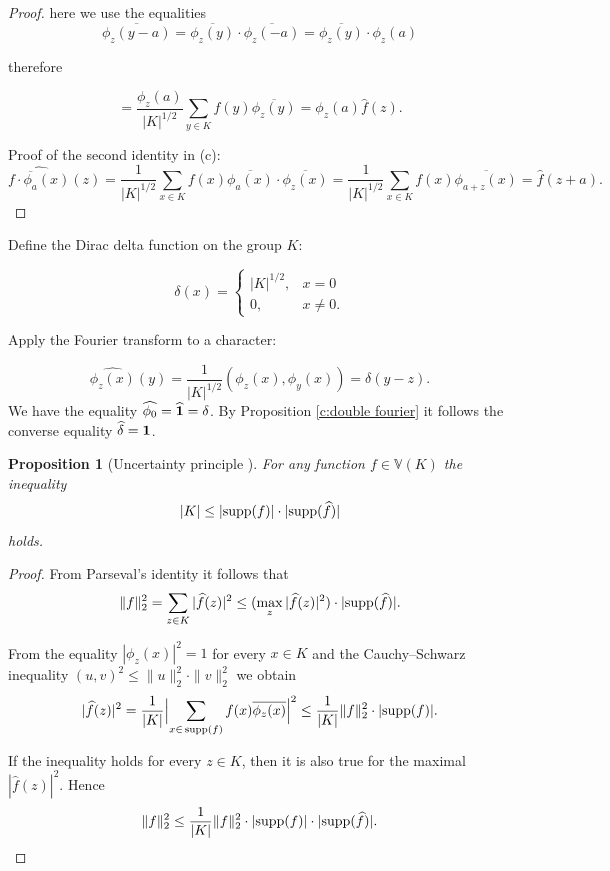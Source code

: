 \documentclass[11pt]{article}
\newtheorem{claim}{Proposition}[section]
\theoremstyle{definition}
\newcommand{\supp}{{\rm supp}}
\begin{document}
{{{\begin{proof}
here we use the equalities
\[ \overline{\phi_z(y-a)}=\overline{\phi_z(y)}\cdot\overline{\phi_z(-a)}=\overline{\phi_z(y)}\cdot\phi_z(a)
\]

therefore

\[
=\frac{\phi_z(a)}{|K|^{1/2}}\sum\limits_{y\in K}
f(y)\overline{\phi_z(y)}=\phi_z(a)\widehat{f}(z).
\]


Proof of the second identity in (c):
\[
\widehat{f\cdot\overline{\phi_a}(x)}(z)=\frac{1}{|K|^{1/2}}\sum\limits_{x\in
K}
f(x)\overline{\phi_a(x)}\cdot\overline{\phi_z(x)}=\frac{1}{|K|^{1/2}}\sum\limits_{x\in
K}f(x)\overline{\phi_{a+z}(x)}=\widehat{f}(z+a).
\]
\end{proof}


Define the Dirac delta function on the group $K$:

\[
\delta(x)=\left\{
\begin{array}{ll}
|K|^{1/2}, & x={0}\\
0, & x\neq 0.
\end{array}
\right.
\]


Apply the Fourier transform to a character:

\[
\widehat{\phi_z(x)}(y)=\frac{1}{|K|^{1/2}}(\phi_z(x),\phi_y(x))=\delta(y-z).\]
 We have the equality
$\widehat{\phi_0}=\widehat{\bf 1}=\delta$. By Proposition \ref{c:double fourier} it follows the converse equality $\widehat{\delta}= {\bf 1}$.


\begin{claim}[Uncertainty principle \cite{Tao}]\label{c:uncertainty_heisenberg}
For any function $f\in \mathbb{V}(K)$ the inequality
    \[|K|\le |\supp(f)| \cdot |\supp(\widehat{f})|\]
holds.
\end{claim}
\begin{proof}
From Parseval's identity it follows that
    $$\|f\|_2^2=\sum\limits_{z\in K} |\widehat{f}(z)|^2\le
    (\max\limits_{z}|\widehat{f}(z)|^2)
    \cdot |\supp(\widehat{f})|.$$

    From the equality $|\phi_z(x)|^2=1$ for every $x\in K$ and the Cauchy--Schwarz inequality
    $
    (u,v)^2\le \|u\|^2_2\cdot\|v\|^2_2
    $ we obtain
    \[|\widehat{f}(z)|^2=\frac{1}{|K|}\Bigl|\sum\limits_{x\in\,\supp(f)}f(x)
    \overline{\phi_z(x)} \Bigr|^2\le \frac{1}{|K|}\|f\|_2^2\cdot|\supp(f)|. \]

    If the inequality holds for every $z\in K$, then it is also true for the maximal $|\widehat{f}(z)|^2$.
    Hence
    \[
    \|f\|_2^2\le \frac{1}{|K|} \|f\|_2^2 \cdot |\supp(f)| \cdot
    |\supp(\widehat{f})|.
    \]
\end{proof}

}}}
\end{document}
